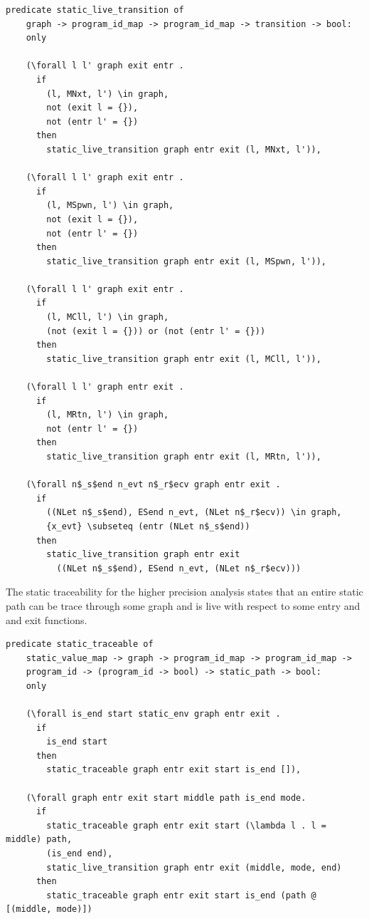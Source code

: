 \documentclass{article}
\begin{document}
\begin{lstlisting}[language=logic, mathescape]
  predicate static_live_transition of
    graph -> program_id_map -> program_id_map -> transition -> bool:
    only

    (\forall l l' graph exit entr . 
      if
        (l, MNxt, l') \in graph,
        not (exit l = {}),
        not (entr l' = {})
      then
        static_live_transition graph entr exit (l, MNxt, l')),

    (\forall l l' graph exit entr .
      if
        (l, MSpwn, l') \in graph, 
        not (exit l = {}),
        not (entr l' = {})
      then
        static_live_transition graph entr exit (l, MSpwn, l')),

    (\forall l l' graph exit entr .
      if
        (l, MCll, l') \in graph,
        (not (exit l = {})) or (not (entr l' = {}))
      then
        static_live_transition graph entr exit (l, MCll, l')),

    (\forall l l' graph entr exit .
      if
        (l, MRtn, l') \in graph,
        not (entr l' = {})
      then
        static_live_transition graph entr exit (l, MRtn, l')),

    (\forall n$_s$end n_evt n$_r$ecv graph entr exit .
      if
        ((NLet n$_s$end), ESend n_evt, (NLet n$_r$ecv)) \in graph, 
        {x_evt} \subseteq (entr (NLet n$_s$end))
      then
        static_live_transition graph entr exit
          ((NLet n$_s$end), ESend n_evt, (NLet n$_r$ecv)))
  \end{lstlisting}

The static traceability for the higher precision analysis states
that an entire static path can be trace through some graph and
is live with respect to some entry and and exit functions.

\begin{lstlisting}[language=logic, mathescape]
  predicate static_traceable of
    static_value_map -> graph -> program_id_map -> program_id_map ->
    program_id -> (program_id -> bool) -> static_path -> bool:
    only

    (\forall is_end start static_env graph entr exit .
      if
        is_end start
      then
        static_traceable graph entr exit start is_end []),

    (\forall graph entr exit start middle path is_end mode. 
      if
        static_traceable graph entr exit start (\lambda l . l = middle) path, 
        (is_end end),
        static_live_transition graph entr exit (middle, mode, end) 
      then
        static_traceable graph entr exit start is_end (path @ [(middle, mode)])
  \end{lstlisting}
\end{document}
